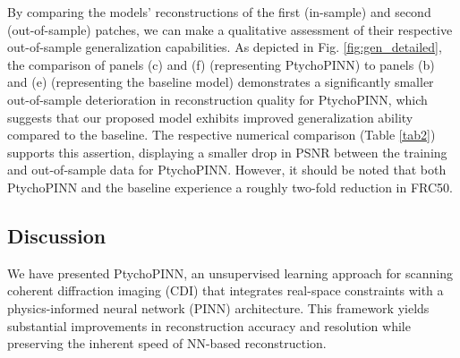 \documentclass[sn-mathphys]{sn-jnl}%
\theoremstyle{thmstyleone}%
\theoremstyle{thmstyletwo}%
\theoremstyle{thmstylethree}%
\begin{document}
By comparing the models' reconstructions of the first (in-sample) and second (out-of-sample) patches, we can make a qualitative assessment of their respective out-of-sample generalization capabilities. As depicted in Fig. \ref{fig:gen_detailed}, the comparison of panels (c) and (f) (representing PtychoPINN) to panels (b) and (e) (representing the baseline model) demonstrates a significantly smaller out-of-sample deterioration in reconstruction quality for PtychoPINN, which suggests that our proposed model exhibits improved generalization ability compared to the baseline. The respective numerical comparison (Table \ref{tab2}) supports this assertion, displaying a smaller drop in PSNR between the training and out-of-sample data for PtychoPINN. However, it should be noted that both PtychoPINN and the baseline experience a roughly two-fold reduction in FRC50.



\subsection{Discussion}
We have presented PtychoPINN, an unsupervised learning approach for scanning coherent diffraction imaging (CDI) that integrates real-space constraints with a physics-informed neural network (PINN) architecture. This framework yields substantial improvements in reconstruction accuracy and resolution while preserving the inherent speed of NN-based reconstruction. 

\end{document}

